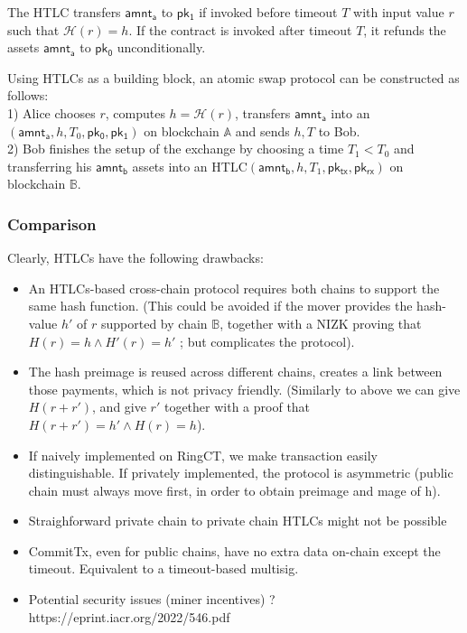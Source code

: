 \documentclass{article}      	%
\begin{document}
The HTLC transfers $\mathsf{amnt_a}$ to $\mathsf{pk_1}$ if invoked before timeout $T$ with input value $r$ such that $\mathcal{H}(r) = h$. 
If the contract is invoked after timeout $T$, it refunds the assets $\mathsf{amnt_a}$ to $\mathsf{pk_0}$ unconditionally.

Using HTLCs as a building block, an atomic swap protocol can be constructed as follows: \\
1) Alice chooses $r$, computes $h = \mathcal{H}(r)$, transfers $\mathsf{amnt_a}$ into an $(\mathsf{amnt_a}, h, T_0, \mathsf{pk_0}, \mathsf{pk_1})$ on blockchain $\mathbb{A}$ and sends $h,T$ to Bob. \\
2) Bob finishes the setup of the exchange by choosing a time $T_1 < T_0$ and transferring his $\mathsf{amnt_b}$ assets into an HTLC$(\mathsf{amnt_b}, h, T_1, \mathsf{pk_{tx}}, \mathsf{pk_{rx}})$ on blockchain $\mathbb{B}$.


\subsubsection{Comparison}
Clearly, HTLCs have the following drawbacks:
\begin{itemize}
	\item An HTLCs-based cross-chain protocol requires both chains to support the same hash function. (This could be avoided if the mover provides the hash-value $h'$ of $r$ supported by chain $\mathbb{B}$, together with a NIZK proving that $H(r) = h \land H'(r) = h'$ ; but complicates the protocol).
	\item The hash preimage is reused across different chains, creates a link between those payments, which is not privacy friendly. (Similarly to above we can give $H(r+r')$, and give $r'$ together with a proof that $H(r+r') = h' \land H(r) = h$).
	\item If naively implemented on RingCT, we make transaction easily distinguishable. If privately implemented, the protocol is asymmetric (public chain must always move first, in order to obtain preimage and mage of h).
	\item Straighforward private chain to private chain HTLCs might not be possible
	\item CommitTx, even for public chains, have no extra data on-chain except the timeout. Equivalent to a timeout-based multisig.
	\item Potential security issues (miner incentives) ? https://eprint.iacr.org/2022/546.pdf
\end{itemize}
\end{document}
